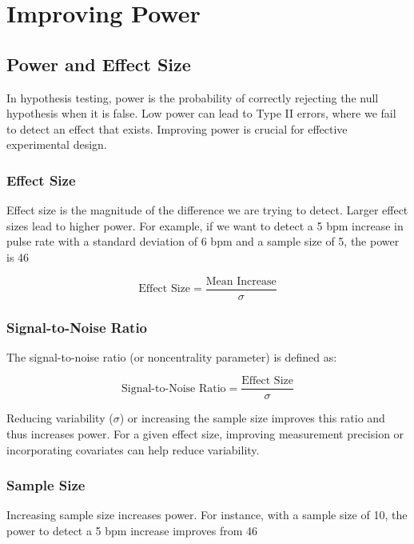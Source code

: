 \documentclass{article}
\begin{document}
\section*{Improving Power}

\subsection*{Power and Effect Size}

In hypothesis testing, power is the probability of correctly rejecting the null hypothesis when it is false. Low power can lead to Type II errors, where we fail to detect an effect that exists. Improving power is crucial for effective experimental design.

\subsubsection*{Effect Size}

Effect size is the magnitude of the difference we are trying to detect. Larger effect sizes lead to higher power. For example, if we want to detect a 5 bpm increase in pulse rate with a standard deviation of 6 bpm and a sample size of 5, the power is 46%

\[
\text{Effect Size} = \frac{\text{Mean Increase}}{\sigma}
\]

\subsubsection*{Signal-to-Noise Ratio}

The signal-to-noise ratio (or noncentrality parameter) is defined as:

\[
\text{Signal-to-Noise Ratio} = \frac{\text{Effect Size}}{\sigma}
\]

Reducing variability (\(\sigma\)) or increasing the sample size improves this ratio and thus increases power. For a given effect size, improving measurement precision or incorporating covariates can help reduce variability.

\subsubsection*{Sample Size}

Increasing sample size increases power. For instance, with a sample size of 10, the power to detect a 5 bpm increase improves from 46%
\end{document}
